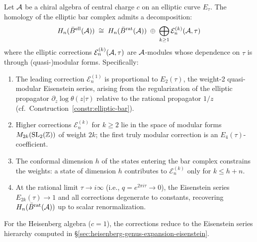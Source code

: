 \begin{theorem}\label{thm:elliptic-vs-rational}
Let $\mathcal{A}$ be a chiral algebra of central charge $c$ on an elliptic curve $E_\tau$.
The homology of the elliptic bar complex admits a decomposition:
\[
H_n(\bar{B}^{\mathrm{ell}}(\mathcal{A})) \;\cong\; H_n(\bar{B}^{\mathrm{rat}}(\mathcal{A}))
\;\oplus\; \bigoplus_{k \geq 1} \mathcal{E}^{(k)}_n(\mathcal{A}, \tau)
\]
where the elliptic corrections $\mathcal{E}^{(k)}_n(\mathcal{A}, \tau)$
are $\mathcal{A}$-modules whose dependence on $\tau$ is through
(quasi-)modular forms. Specifically:
\begin{enumerate}[label=(\roman*)]
\item The leading correction $\mathcal{E}^{(1)}_n$ is
proportional to $E_2(\tau)$, the weight-2 quasi-modular
Eisenstein series, arising from the regularization of
the elliptic propagator $\partial_z \log\theta(z|\tau)$
relative to the rational propagator $1/z$
(cf.\ Construction~\ref{constr:elliptic-bar}).
\item Higher corrections $\mathcal{E}^{(k)}_n$ for $k \geq 2$
lie in the space of modular forms $M_{2k}(\mathrm{SL}_2(\mathbb{Z}))$
of weight $2k$; the first truly modular correction is an
$E_4(\tau)$-coefficient.
\item The conformal dimension $h$ of the states entering the
bar complex constrains the weights: a state of dimension $h$
contributes to $\mathcal{E}^{(k)}_n$ only for $k \leq h + n$.
\item At the rational limit $\tau \to i\infty$ (i.e., $q = e^{2\pi i\tau} \to 0$),
the Eisenstein series $E_{2k}(\tau) \to 1$ and all corrections
degenerate to constants, recovering
$H_n(\bar{B}^{\mathrm{rat}}(\mathcal{A}))$ up to scalar renormalization.
\end{enumerate}
For the Heisenberg algebra ($c = 1$), the corrections reduce to the
Eisenstein series hierarchy computed in
\S\ref{sec:heisenberg-genus-expansion-eisenstein}.
\end{theorem}

